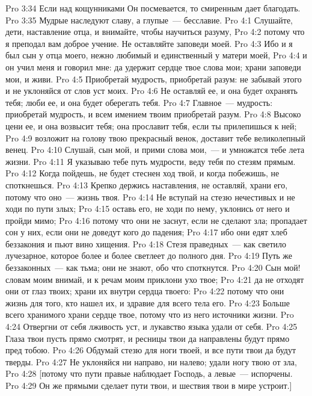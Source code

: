 \vs Pro 3:34 Если над кощунниками Он посмевается, то смиренным дает благодать.
\vs Pro 3:35 Мудрые наследуют славу, а глупые~--- бесславие.
\vs Pro 4:1 Слушайте, дети, наставление отца, и внимайте, чтобы научиться разуму,
\vs Pro 4:2 потому что я преподал вам доброе учение. Не оставляйте заповеди моей.
\vs Pro 4:3 Ибо и я был сын у отца моего, нежно любимый и единственный у матери моей,
\vs Pro 4:4 и он учил меня и говорил мне: да удержит сердце твое слова мои; храни заповеди мои, и живи.
\vs Pro 4:5 Приобретай мудрость, приобретай разум: не забывай этого и не уклоняйся от слов уст моих.
\vs Pro 4:6 Не оставляй ее, и она будет охранять тебя; люби ее, и она будет оберегать тебя.
\vs Pro 4:7 Главное~--- мудрость: приобретай мудрость, и всем имением твоим приобретай разум.
\vs Pro 4:8 Высоко цени ее, и она возвысит тебя; она прославит тебя, если ты прилепишься к ней;
\vs Pro 4:9 возложит на голову твою прекрасный венок, доставит тебе великолепный венец.
\rsbpar\vs Pro 4:10 Слушай, сын мой, и прими слова мои,~--- и умножатся тебе лета жизни.
\vs Pro 4:11 Я указываю тебе путь мудрости, веду тебя по стезям прямым.
\vs Pro 4:12 Когда пойдешь, не будет стеснен ход твой, и когда побежишь, не споткнешься.
\vs Pro 4:13 Крепко держись наставления, не оставляй, храни его, потому что оно~--- жизнь твоя.
\vs Pro 4:14 Не вступай на стезю нечестивых и не ходи по пути злых;
\vs Pro 4:15 оставь его, не ходи по нему, уклонись от него и пройди мимо;
\vs Pro 4:16 потому что они не заснут, если не сделают зла; пропадает сон у них, если они не доведут кого до падения;
\vs Pro 4:17 ибо они едят хлеб беззакония и пьют вино хищения.
\vs Pro 4:18 Стезя праведных~--- как светило лучезарное, которое более и более светлеет до полного дня.
\vs Pro 4:19 Путь же беззаконных~--- как тьма; они не знают, обо что споткнутся.
\rsbpar\vs Pro 4:20 Сын мой! словам моим внимай, и к речам моим приклони ухо твое;
\vs Pro 4:21 да не отходят они от глаз твоих; храни их внутри сердца твоего:
\vs Pro 4:22 потому что они жизнь для того, кто нашел их, и здравие для всего тела его.
\vs Pro 4:23 Больше всего хранимого храни сердце твое, потому что из него источники жизни.
\vs Pro 4:24 Отвергни от себя лживость уст, и лукавство языка удали от себя.
\vs Pro 4:25 Глаза твои пусть прямо смотрят, и ресницы твои да направлены будут прямо пред тобою.
\vs Pro 4:26 Обдумай стезю для ноги твоей, и все пути твои да будут тверды.
\vs Pro 4:27 Не уклоняйся ни направо, ни налево; удали ногу твою от зла,
\vs Pro 4:28 [потому что пути правые наблюдает Господь, а левые~--- испорчены.
\vs Pro 4:29 Он же прямыми сделает пути твои, и шествия твои в мире устроит.]
